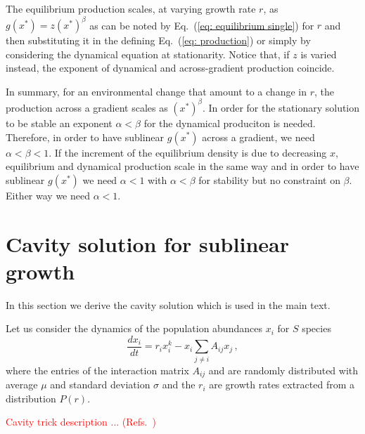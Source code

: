 \documentclass[10pt]{article}
\begin{document}
The equilibrium production scales, at varying growth rate $r$,
as $g(x^*)=z(x^*)^\beta$ as can be noted by Eq.~(\ref{eq: equilibrium single})
for $r$ and then substituting it in the defining Eq.~(\ref{eq: production})
or simply by considering the dynamical equation at stationarity.
Notice that, if $z$ is varied instead, the exponent
of dynamical and across-gradient production coincide.

In summary, for an environmental change that amount to a change in $r$, 
the production across a gradient 
scales as $(x^*)^\beta$. In order for
the stationary solution to be stable an exponent $\alpha<\beta$
for the dynamical produciton is needed.
Therefore, in order to have sublinear $g(x^*)$ across a gradient,
we need $\alpha<\beta<1$.
If the increment of the equilibrium density is due to decreasing $x$,
equilibrium and dynamical production scale in the same way and in order to
have sublinear $g(x^*)$ we need $\alpha<1$ with $\alpha<\beta$ for stability
but no constraint on $\beta$. Either way we need $\alpha<1$.

\section{Cavity solution for sublinear growth}
\label{sec: cavity solution}
In this section we derive the cavity solution which is used in the main text.

Let us consider the dynamics of the population abundances $x_i$ for $S$ species
\begin{equation}
    \frac{d x_i}{dt} = r_ix_i^k - x_i\sum_{j\neq i}A_{ij}x_j \, ,
    \label{eq: full system}
\end{equation}
where the entries of the interaction matrix $A_{ij}$ 
and are randomly distributed with average $\mu$ and standard deviation $\sigma$
and the $r_i$ are growth rates extracted from a distribution $P(r)$. 

\textcolor{red}{Cavity trick description ... 
(Refs.~\cite{Bunin2017,Barbier18,Barbier17,Advani2018,Cui2020})}
\end{document}
